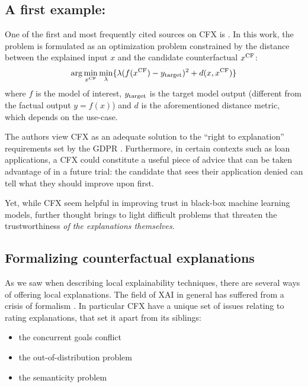 \documentclass[../main.tex]{subfiles}
\begin{document}
\subsection{A first example: \citeauthor{wachterCounterfactual2017}}
One of the first and most frequently cited sources on CFX is \citeauthor{wachterCounterfactual2017} \cite{wachterCounterfactual2017}. In this work, the problem is formulated as an optimization problem constrained by the distance between the explained input $x$ and the candidate counterfactual $x^\text{CF}$:
\begin{equation}
\arg\min_{x^\text{CF}} \min_\lambda \{ \lambda (f(x^\text{CF}) - y_{\mathrm{target}})^2 + d(x, x^\text{CF}) \}
\end{equation}
where $f$ is the model of interest, $y_{\mathrm{target}}$ is the target model output (different from the factual output $y = f(x)$) and $d$ is the aforementioned distance metric, which depends on the use-case.

The authors view CFX as an adequate solution to the ``right to explanation'' requirements set by the GDPR \cite{kaminskiRight2018}.
Furthermore, in certain contexts such as loan applications, a CFX could constitute a useful piece of advice that can be taken advantage of in a future trial: the candidate that sees their application denied can tell what they should improve upon first.

Yet, while CFX seem helpful in improving trust in black-box machine learning models, further thought brings to light difficult problems that threaten the trustworthiness \emph{of the explanations themselves}.

\subsection{Formalizing counterfactual explanations}

As we saw when describing local explainability techniques, there are several ways of offering local explanations.
The field of XAI in general has suffered from a crisis of formalism \cite{liptonMythos2017, leavittFalsifiable2020}.
In particular CFX have a unique set of issues relating to rating explanations, that set it apart from its siblings:
\begin{itemize}
    \item the concurrent goals conflict
    \item the out-of-distribution problem
    \item the semanticity problem
\end{itemize}
\end{document}
